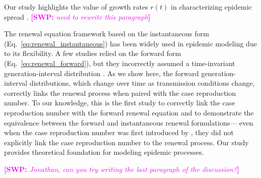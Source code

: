 \documentclass[12pt]{article}
\newcommand{\comment}{\showcomment}
\newcommand{\showcomment}[3]{\textcolor{#1}{\textbf{[#2: }\textsl{#3}\textbf{]}}}
\newcommand{\swp}[1]{\comment{magenta}{SWP}{#1}}
\newcommand{\eref}[1]{Eq.~\ref{eq:#1}}
\newcommand{\Rx}[1]{\ensuremath{{\mathcal R}_{#1}}\xspace}
\newcommand{\Ri}{\Rx{\mathrm{i}}}
\newcommand{\RR}{\ensuremath{{\mathcal R}}\xspace}
\begin{document}
Our study highlights the value of growth rates $r(t)$ in characterizing epidemic spread \citep{abbott2020temporal,anderson2020reproduction}.
\swp{need to rewrite this paragraph}

The renewal equation framework based on the instantaneous form (\eref{renewal_instantaneous}) has been widely used in epidemic modeling due to its flexibility.
A few studies relied on the forward form (\eref{renewal_forward}), but they incorrectly assumed a time-invariant generation-interval distribution \citep{nishiura2007time,alvarez2020variational,white2021statistical}.
As we show here, the forward generation-interval distributions, which change over time as transmission conditions change, correctly links the renewal process when paired with the case reproduction number.
To our knowledge, this is the first study to correctly link the case reproduction number with the forward renewal equation and to demonstrate the equivalence between the forward and instantaneous renewal formulations---
even when the case reproduction number was first introduced by \cite{wallinga2004different}, they did not explicitly link the case reproduction number to the renewal process.
Our study provides theoretical foundation for modeling epidemic processes.

\swp{Jonathan, can you try writing the last paragraph of the discussion?}
\end{document}
